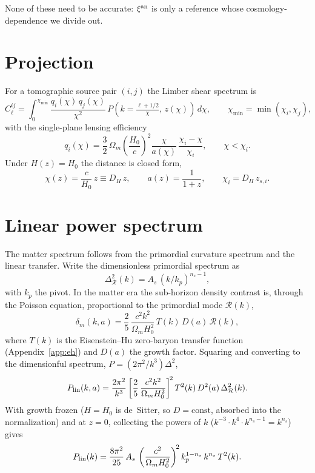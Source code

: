 \documentclass[11pt]{article}
\newcommand{\Om}{\Omega_m}
\newcommand{\As}{A_s}
\newcommand{\ns}{n_s}
\newcommand{\Dhub}{D_H}
\begin{document}
None of these need to be accurate: $\xi^{\rm an}$ is only a
reference whose cosmology-dependence we divide out.

\section{Projection}

For a tomographic source pair $(i,j)$ the Limber shear spectrum is
\begin{equation}
  C_\ell^{ij}
  = \int_0^{\chi_{\min}}\! \frac{q_i(\chi)\,q_j(\chi)}{\chi^2}\,
    P\!\left(k=\tfrac{\ell+1/2}{\chi},\,z(\chi)\right)\,d\chi,
  \qquad \chi_{\min}=\min(\chi_i,\chi_j),
  \label{eq:limber}
\end{equation}
with the single-plane lensing efficiency
\begin{equation}
  q_i(\chi)=\frac{3}{2}\,\Om\left(\frac{H_0}{c}\right)^2
            \frac{\chi}{a(\chi)}\,\frac{\chi_i-\chi}{\chi_i},
            \qquad \chi<\chi_i .
  \label{eq:kernel}
\end{equation}
Under $H(z)=H_0$ the distance is closed form,
\begin{equation}
  \chi(z)=\frac{c}{H_0}\,z \equiv \Dhub\,z,
  \qquad a(z)=\frac{1}{1+z},
  \qquad \chi_i=\Dhub\,z_{s,i}.
  \label{eq:dist}
\end{equation}

\section{Linear power spectrum}

The matter spectrum follows from the primordial curvature spectrum
and the linear transfer. Write the dimensionless primordial spectrum
as
\begin{equation}
  \Delta_\mathcal{R}^2(k)=\As\,(k/k_p)^{\ns-1},
\end{equation}
with $k_p$ the pivot. In the matter era the sub-horizon density
contrast is, through the Poisson equation, proportional to the
primordial mode $\mathcal{R}(k)$,
\begin{equation}
  \delta_m(k,a)=\frac{2}{5}\,\frac{c^2 k^2}{\Om H_0^2}\,
  T(k)\,D(a)\,\mathcal{R}(k),
\end{equation}
where $T(k)$ is the Eisenstein--Hu zero-baryon transfer function
(Appendix~\ref{app:eh}) and $D(a)$ the growth factor. Squaring and
converting to the dimensionful spectrum, $P=(2\pi^2/k^3)\Delta^2$,
\begin{equation}
  P_{\rm lin}(k,a)=\frac{2\pi^2}{k^3}
  \left[\frac{2}{5}\,\frac{c^2 k^2}{\Om H_0^2}\right]^{\!2}
  T^2(k)\,D^2(a)\,\Delta_\mathcal{R}^2(k).
\end{equation}
With growth frozen ($H=H_0$ is de~Sitter, so $D=\text{const}$,
absorbed into the normalization) and at $z=0$, collecting the powers
of $k$ ($k^{-3}\cdot k^4\cdot k^{\ns-1}=k^{\ns}$) gives
\begin{equation}
  P_{\rm lin}(k)=\frac{8\pi^2}{25}\,\As\,
  \left(\frac{c^2}{\Om H_0^2}\right)^{\!2}
  k_p^{1-\ns}\,k^{\ns}\,T^2(k).
  \label{eq:plin}
\end{equation}
\end{document}
